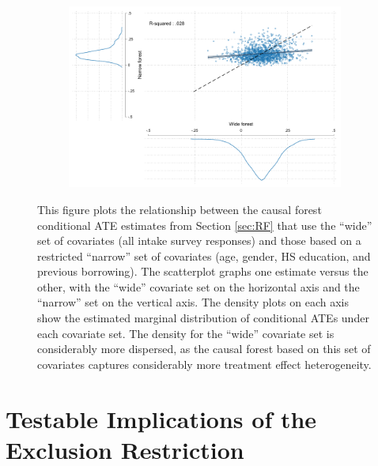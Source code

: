 \begin{appendix}
\begin{figure}[h!]
   \caption{Conditional ATEs from ``wide'' and ``narrow'' covariate sets.}
    \begin{center}
    \begin{subfigure}{0.75\textwidth}
        \centering
        \includegraphics[width=\textwidth]{Figuras/scatter_hist_wide_narrow.pdf}
    \end{subfigure}
    \end{center}
        \footnotesize{This figure plots the relationship between the causal forest conditional ATE estimates from Section \ref{sec:RF} that use the ``wide'' set of covariates (all intake survey responses) and those based on a restricted ``narrow'' set of covariates (age, gender, HS education, and previous borrowing). The scatterplot graphs one estimate versus the other, with the ``wide'' covariate set on the horizontal axis and the ``narrow'' set on the vertical axis. The density plots on each axis show the estimated marginal distribution of conditional ATEs under each covariate set. The density for the ``wide'' covariate set is considerably more dispersed, as the causal forest based on this set of covariates captures considerably more treatment effect heterogeneity.}
    \label{wide_narrow_forests}

\end{figure}

\clearpage
\newpage 

\section{Testable Implications of the Exclusion Restriction} \label{sec:testing_exclusion}


\end{appendix}
